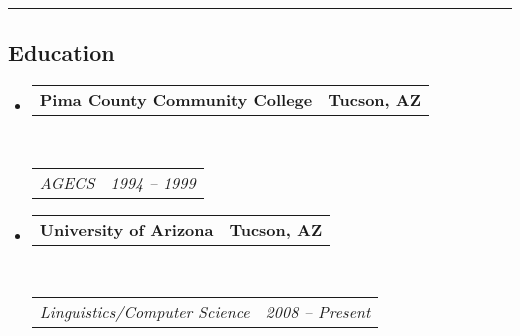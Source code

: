 \documentclass[10pt,letterpaper]{article}
\makeatletter
\newcommand{\headerrow}[2]
{\begin{tabular*}{\linewidth}{l@{\extracolsep{\fill}}r}
	#1 &
	#2 \\
  \end{tabular*}}
\makeatother
\begin{document}
\hrule
\vspace{-0.4em}
\subsection*{Education}

\begin{itemize}
  \parskip=0.1em

\item 
  \headerrow
  {\textbf{Pima County Community College}}
  {\textbf{Tucson, AZ}}
  \\
  \headerrow
  {\emph{AGECS}}
  {\emph{1994 -- 1999}}

\item 
  \headerrow
  {\textbf{University of Arizona}}
  {\textbf{Tucson, AZ}}
  \\
  \headerrow
  {\emph{Linguistics/Computer Science}}
  {\emph{2008 -- Present}}

\end{itemize}
\end{document}
